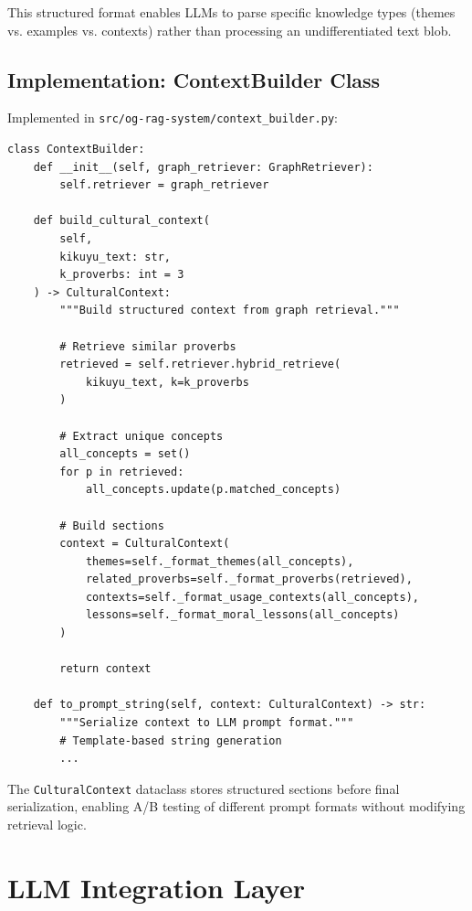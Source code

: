 This structured format enables LLMs to parse specific knowledge types (themes vs. examples vs. contexts) rather than processing an undifferentiated text blob.

\subsection{Implementation: ContextBuilder Class}
\label{subsec:context_builder_impl}

Implemented in \texttt{src/og-rag-system/context\_builder.py}:

\begin{verbatim}
class ContextBuilder:
    def __init__(self, graph_retriever: GraphRetriever):
        self.retriever = graph_retriever
    
    def build_cultural_context(
        self, 
        kikuyu_text: str, 
        k_proverbs: int = 3
    ) -> CulturalContext:
        """Build structured context from graph retrieval."""
        
        # Retrieve similar proverbs
        retrieved = self.retriever.hybrid_retrieve(
            kikuyu_text, k=k_proverbs
        )
        
        # Extract unique concepts
        all_concepts = set()
        for p in retrieved:
            all_concepts.update(p.matched_concepts)
        
        # Build sections
        context = CulturalContext(
            themes=self._format_themes(all_concepts),
            related_proverbs=self._format_proverbs(retrieved),
            contexts=self._format_usage_contexts(all_concepts),
            lessons=self._format_moral_lessons(all_concepts)
        )
        
        return context
    
    def to_prompt_string(self, context: CulturalContext) -> str:
        """Serialize context to LLM prompt format."""
        # Template-based string generation
        ...
\end{verbatim}

The \texttt{CulturalContext} dataclass stores structured sections before final serialization, enabling A/B testing of different prompt formats without modifying retrieval logic.

\section{LLM Integration Layer}
\label{sec:llm_integration}

